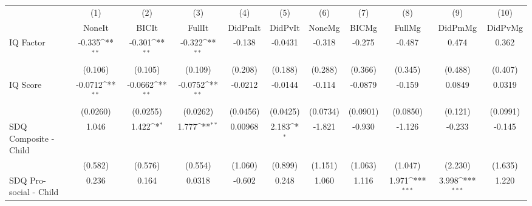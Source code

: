 {
\def\sym#1{\ifmmode^{#1}\else\(^{#1}\)\fi}
\begin{tabular}{l*{10}{c}}
\toprule
            &\multicolumn{1}{c}{(1)}&\multicolumn{1}{c}{(2)}&\multicolumn{1}{c}{(3)}&\multicolumn{1}{c}{(4)}&\multicolumn{1}{c}{(5)}&\multicolumn{1}{c}{(6)}&\multicolumn{1}{c}{(7)}&\multicolumn{1}{c}{(8)}&\multicolumn{1}{c}{(9)}&\multicolumn{1}{c}{(10)}\\
            &\multicolumn{1}{c}{NoneIt}&\multicolumn{1}{c}{BICIt}&\multicolumn{1}{c}{FullIt}&\multicolumn{1}{c}{DidPmIt}&\multicolumn{1}{c}{DidPvIt}&\multicolumn{1}{c}{NoneMg}&\multicolumn{1}{c}{BICMg}&\multicolumn{1}{c}{FullMg}&\multicolumn{1}{c}{DidPmMg}&\multicolumn{1}{c}{DidPvMg}\\
\midrule
IQ Factor   &      -0.335\sym{**} &      -0.301\sym{**} &      -0.322\sym{**} &      -0.138         &     -0.0431         &      -0.318         &      -0.275         &      -0.487         &       0.474         &       0.362         \\
            &     (0.106)         &     (0.105)         &     (0.109)         &     (0.208)         &     (0.188)         &     (0.288)         &     (0.366)         &     (0.345)         &     (0.488)         &     (0.407)         \\
\addlinespace
IQ Score    &     -0.0712\sym{**} &     -0.0662\sym{**} &     -0.0752\sym{**} &     -0.0212         &     -0.0144         &      -0.114         &     -0.0879         &      -0.159         &      0.0849         &      0.0319         \\
            &    (0.0260)         &    (0.0255)         &    (0.0262)         &    (0.0456)         &    (0.0425)         &    (0.0734)         &    (0.0901)         &    (0.0850)         &     (0.121)         &    (0.0991)         \\
\addlinespace
SDQ Composite - Child&       1.046         &       1.422\sym{*}  &       1.777\sym{**} &     0.00968         &       2.183\sym{*}  &      -1.821         &      -0.930         &      -1.126         &      -0.233         &      -0.145         \\
            &     (0.582)         &     (0.576)         &     (0.554)         &     (1.060)         &     (0.899)         &     (1.151)         &     (1.063)         &     (1.047)         &     (2.230)         &     (1.635)         \\
\addlinespace
SDQ Pro-social - Child&       0.236         &       0.164         &      0.0318         &      -0.602         &       0.248         &       1.060         &       1.116         &       1.971\sym{***}&       3.998\sym{***}&       1.220         \\

\end{tabular}}
